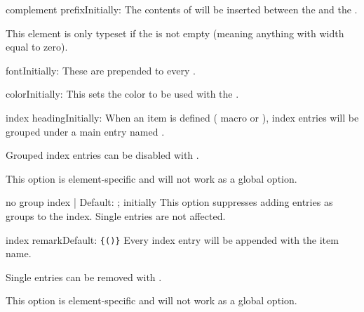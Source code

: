 \documentclass[11pt, outdir = ./out]{article}
\begin{document}
\begin{Optiondef}{complement prefix}{}{Initially: }
    The contents of  will be inserted between the  and the .

    This element is only typeset if the  is not empty (meaning anything with width equal to zero).
\end{Optiondef}

\begin{Optiondef}{font}{}{Initially: }
    These  are prepended to every .
\end{Optiondef}

\begin{Optiondef}{color}{}{Initially: }
    This sets the color to be used with the .
\end{Optiondef}

\begin{Optiondef}{index heading}{}{Initially: }
    When an item is defined ( macro or \hyperref[environmentdef]{}), index entries will be grouped under a main entry named .

    Grouped index entries can be disabled with .

    This option is element-specific and will not work as a global option.
\end{Optiondef}

\begin{Optiondef}{no group index}{ | }{Default: ; initially }
    This option suppresses adding entries as groups to the index. Single entries are not affected.
\end{Optiondef}

\begin{Optiondef}{index remark}{}{Default: \texttt{\{\DocsTilde()\}}}
    Every index entry will be appended with  the item name.

    Single entries can be removed with .

    This option is element-specific and will not work as a global option.
\end{Optiondef}
\end{document}
